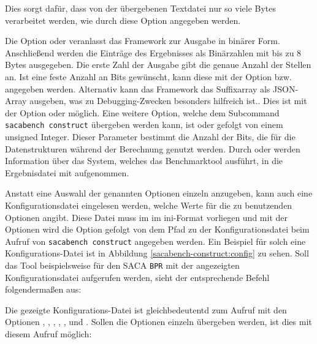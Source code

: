 Dies sorgt dafür, dass von der übergebenen Textdatei nur so viele Bytes verarbeitet werden, wie durch diese Option angegeben werden.\par
Die Option  oder  veranlasst das Framework zur Ausgabe in binärer Form.
Anschließend werden die Einträge des Ergebnisses als Binärzahlen mit bis zu 8 Bytes ausgegeben.
Die erste Zahl der Ausgabe gibt die genaue Anzahl der Stellen an.
Ist eine feste Anzahl an Bits gewünscht, kann diese mit der Option  bzw.  angegeben werden.
Alternativ kann das Framework das Suffixarray als JSON-Array ausgeben, was zu Debugging-Zwecken besonders hilfreich ist.. 
Dies ist mit der Option  oder  möglich.
Eine weitere Option, welche dem Subcommand \texttt{sacabench construct} übergeben werden kann, ist  oder  gefolgt von einem unsigned Integer. 
Dieser Parameter bestimmt die Anzahl der Bits, die für die Datenstrukturen während der Berechnung genutzt werden.
Durch  oder  werden Information über das System, welches das Benchmarktool ausführt, in die Ergebnisdatei mit aufgenommen.\par
Anstatt eine Auswahl der genannten Optionen einzeln anzugeben, kann auch eine Konfigurationsdatei eingelesen werden, welche Werte für die zu benutzenden Optionen angibt.
Diese Datei muss im im ini-Format vorliegen und mit der Optionen wird die Option  gefolgt von dem Pfad zu der Konfigurationsdatei beim Aufruf von \texttt{sacabench construct} angegeben werden.
Ein Beispiel für solch eine Konfigurations-Datei ist in Abbildung \ref{sacabench-construct:config} zu sehen.
Soll das Tool beispielsweise für den SACA \texttt{BPR} mit der angezeigten Konfigurationsdatei aufgerufen werden, sieht der entsprechende Befehl folgendermaßen aus:


Die gezeigte Konfigurations-Datei ist gleichbedeutentd zum Aufruf mit den Optionen , , , , ,  und .
Sollen die Optionen einzeln übergeben werden, ist dies mit diesem Aufruf möglich:

\par

